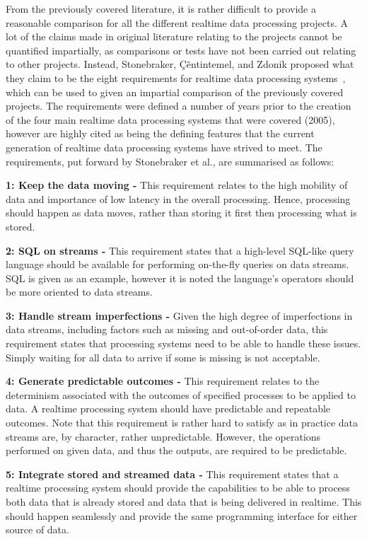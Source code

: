 From the previously covered literature, it is rather difficult to provide a reasonable comparison for all the different
realtime data processing projects. A lot of the claims made in original literature relating to the projects cannot be
quantified impartially, as comparisons or tests have not been carried out relating to other projects. Instead, Stonebraker,
\c{C}\~entintemel, and Zdonik proposed what they claim to be the eight requirements for realtime data processing systems~\cite{stonebraker_8_2005},
which can be used to given an impartial comparison of the previously covered projects. The requirements were defined a
number of years prior to the creation of the four main realtime data processing systems that were covered (2005), however are highly
cited as being the defining features that the current generation of realtime data processing systems have strived to meet.
The requirements, put forward by Stonebraker et al., are summarised as follows:

\noindent \textbf{1: Keep the data moving -} This requirement relates to the high mobility of data and importance of low
latency in the overall processing. Hence, processing should happen as data moves, rather than storing it first then
processing what is stored.

\noindent \textbf{2: SQL on streams -} This requirement states that a high-level SQL-like query language should be
available for performing on-the-fly queries on data streams. SQL is given as an example, however it is noted the language's
operators should be more oriented to data streams.

\noindent \textbf{3: Handle stream imperfections -} Given the high degree of imperfections in data streams, including
factors such as missing and out-of-order data, this requirement states that processing systems need to be able to handle
these issues. Simply waiting for all data to arrive if some is missing is not acceptable.

\noindent \textbf{4: Generate predictable outcomes -} This requirement relates to the determinism associated with the
outcomes of specified processes to be applied to data. A realtime processing system should have predictable and repeatable
outcomes. Note that this requirement is rather hard to satisfy as in practice data streams are, by character, rather
unpredictable. However, the operations performed on given data, and thus the outputs, are required to be predictable.

\noindent \textbf{5: Integrate stored and streamed data -} This requirement states that a realtime processing system
should provide the capabilities to be able to process both data that is already stored and data that is being delivered
in realtime. This should happen seamlessly and provide the same programming interface for either source of data.

